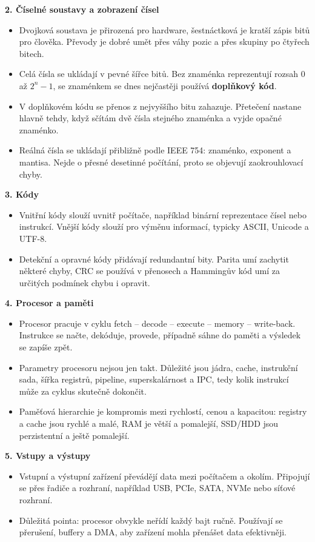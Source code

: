 \documentclass[11pt,a4paper]{article}
\begin{document}
\textbf{2. Číselné soustavy a zobrazení čísel}
\begin{itemize}
  \item Dvojková soustava je přirozená pro hardware, šestnáctková je kratší zápis bitů pro člověka. Převody je dobré umět přes váhy pozic a přes skupiny po čtyřech bitech.
  \item Celá čísla se ukládají v pevné šířce bitů. Bez znaménka reprezentují rozsah 0 až $2^n-1$, se znaménkem se dnes nejčastěji používá \textbf{doplňkový kód}.
  \item V doplňkovém kódu se přenos z nejvyššího bitu zahazuje. Přetečení nastane hlavně tehdy, když sčítám dvě čísla stejného znaménka a vyjde opačné znaménko.
  \item Reálná čísla se ukládají přibližně podle IEEE 754: znaménko, exponent a mantisa. Nejde o přesné desetinné počítání, proto se objevují zaokrouhlovací chyby.
\end{itemize}

\textbf{3. Kódy}
\begin{itemize}
  \item Vnitřní kódy slouží uvnitř počítače, například binární reprezentace čísel nebo instrukcí. Vnější kódy slouží pro výměnu informací, typicky ASCII, Unicode a UTF-8.
  \item Detekční a opravné kódy přidávají redundantní bity. Parita umí zachytit některé chyby, CRC se používá v přenosech a Hammingův kód umí za určitých podmínek chybu i opravit.
\end{itemize}

\textbf{4. Procesor a paměti}
\begin{itemize}
  \item Procesor pracuje v cyklu fetch -- decode -- execute -- memory -- write-back. Instrukce se načte, dekóduje, provede, případně sáhne do paměti a výsledek se zapíše zpět.
  \item Parametry procesoru nejsou jen takt. Důležité jsou jádra, cache, instrukční sada, šířka registrů, pipeline, superskalárnost a IPC, tedy kolik instrukcí může za cyklus skutečně dokončit.
  \item Paměťová hierarchie je kompromis mezi rychlostí, cenou a kapacitou: registry a cache jsou rychlé a malé, RAM je větší a pomalejší, SSD/HDD jsou perzistentní a ještě pomalejší.
\end{itemize}

\textbf{5. Vstupy a výstupy}
\begin{itemize}
  \item Vstupní a výstupní zařízení převádějí data mezi počítačem a okolím. Připojují se přes řadiče a rozhraní, například USB, PCIe, SATA, NVMe nebo síťové rozhraní.
  \item Důležitá pointa: procesor obvykle neřídí každý bajt ručně. Používají se přerušení, buffery a DMA, aby zařízení mohla přenášet data efektivněji.
\end{itemize}
\end{document}
